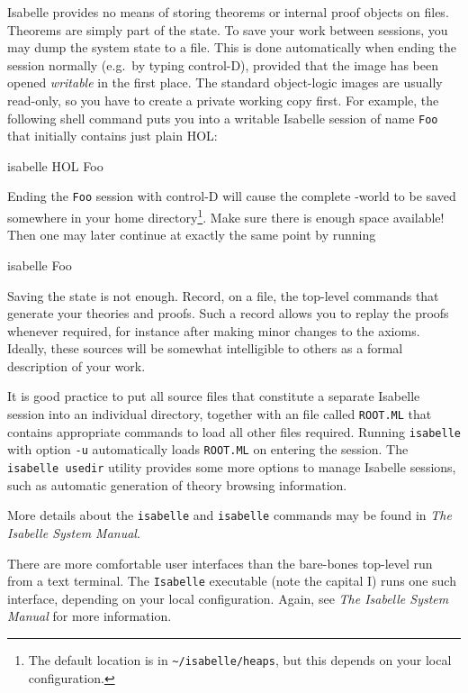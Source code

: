  Isabelle provides no means of storing
theorems or internal proof objects on files.  Theorems are simply part of the
\ML{} state.  To save your work between sessions, you may dump the \ML{}
system state to a file.  This is done automatically when ending the session
normally (e.g.\ by typing control-D), provided that the image has been opened
\emph{writable} in the first place.  The standard object-logic images are
usually read-only, so you have to create a private working copy first.  For
example, the following shell command puts you into a writable Isabelle session
of name \texttt{Foo} that initially contains just plain HOL:
\begin{ttbox}
isabelle HOL Foo
\end{ttbox}
Ending the \texttt{Foo} session with control-D will cause the complete
\ML-world to be saved somewhere in your home directory\footnote{The default
  location is in \texttt{\~\relax/isabelle/heaps}, but this depends on your
  local configuration.}.  Make sure there is enough space available! Then one
may later continue at exactly the same point by running
\begin{ttbox}
isabelle Foo  
\end{ttbox}

\medskip Saving the {\ML} state is not enough.  Record, on a file, the
top-level commands that generate your theories and proofs.  Such a record
allows you to replay the proofs whenever required, for instance after making
minor changes to the axioms.  Ideally, these sources will be somewhat
intelligible to others as a formal description of your work.

It is good practice to put all source files that constitute a separate
Isabelle session into an individual directory, together with an {\ML} file
called \texttt{ROOT.ML} that contains appropriate commands to load all other
files required.  Running \texttt{isabelle} with option \texttt{-u}
automatically loads \texttt{ROOT.ML} on entering the session.  The
\texttt{isabelle usedir} utility provides some more options to manage Isabelle
sessions, such as automatic generation of theory browsing information.

\medskip More details about the \texttt{isabelle} and \texttt{isabelle}
commands may be found in \emph{The Isabelle System Manual}.

\medskip There are more comfortable user interfaces than the bare-bones \ML{}
top-level run from a text terminal.  The \texttt{Isabelle} executable (note
the capital I) runs one such interface, depending on your local configuration.
Again, see \emph{The Isabelle System Manual} for more information.



